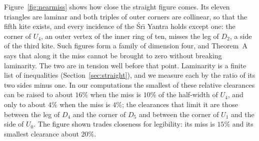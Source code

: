 \documentclass[11pt,a4paper]{article}
\theoremstyle{definition}
\theoremstyle{remark}
\newcommand{\Sri}{\'Sr\={\i}}
\begin{document}
Figure~\ref{fig:nearmiss} shows how close the straight figure comes. Its eleven triangles are laminar
and both triples of outer corners are collinear, so that the fifth kite exists, and every incidence of
the \Sri{} Yantra holds except one: the corner of $U_4$, an outer vertex of the inner ring of ten, misses
the leg of $D_2$, a side of the third kite. Such figures form a family of dimension four, and Theorem~A
says that along it the miss cannot be brought to zero without breaking laminarity. The two are in
tension well before that point. Laminarity is a finite list of inequalities (Section~\ref{sec:straight}),
and we measure each by the ratio of its two sides minus one. In our computations the smallest of these
relative clearances can be raised to about $16\%$ when the miss is $10\%$ of the half-width of $U_4$,
and only to about $4\%$ when the miss is $4\%$; the clearances that limit it are those between the leg of
$D_4$ and the corner of $D_5$ and between the corner of $U_1$ and the side of $U_0$. The figure shown
trades closeness for legibility: its miss is $15\%$ and its smallest clearance about $20\%$.
\end{document}
